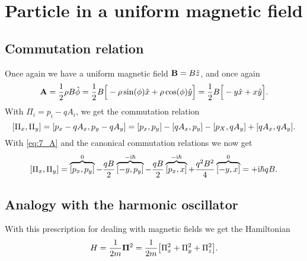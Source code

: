 \documentclass[11pt,letter, swedish, english
]{article}
\begin{document}
\section{Particle in a uniform magnetic field}
\subsection{Commutation relation}
Once again we have a uniform magnetic field $\vb{B}=B\hat{z}$, and
once again 
\begin{equation}\label{eq:7_A}
\vb{A}=\frac{1}{2}\rho B\hat{\phi}
=\frac{1}{2}B\Big[-\rho\sin(\phi)\hat{x}+\rho\cos(\phi)\hat{y}\Big]
=\frac{1}{2}B\Big[-y\hat{x}+x\hat{y}\Big].
\end{equation}
With $\Pi_i=p_i-qA_i$, we get the commutation relation
\begin{equation}
\comm{\Pi_x}{\Pi_y}=\comm{p_x-qA_x}{p_y-qA_y}
=\comm{p_x}{p_y}-\comm{qA_x}{p_y}-\comm{p_X}{qA_y}+\comm{qA_x}{qA_y}.
\end{equation}
With \eqref{eq:7_A} and the canonical commutation relations we now get
\begin{equation}\label{eq:7_comm}
\comm{\Pi_x}{\Pi_y}
=\overbrace{\comm{p_x}{p_y}}^{0}
-\frac{qB}{2}\overbrace{\comm{-y}{p_y}}^{-\ii\hbar}
-\frac{qB}{2}\overbrace{\comm{p_x}{x}}^{-\ii\hbar}
+\frac{q^2B^2}{4}\overbrace{\comm{-y}{x}}^{0}
=+\ii\hbar qB.
\end{equation}

\subsection{Analogy with the harmonic oscillator}
With this prescription for dealing with magnetic fields we get the
Hamiltonian 
\begin{equation}\label{eq:7_H}
H=\frac{1}{2m}\vb{\Pi}^2=\frac{1}{2m}\qty[\Pi_x^2+\Pi_y^2+\Pi_z^2]. 
\end{equation}
\end{document}
